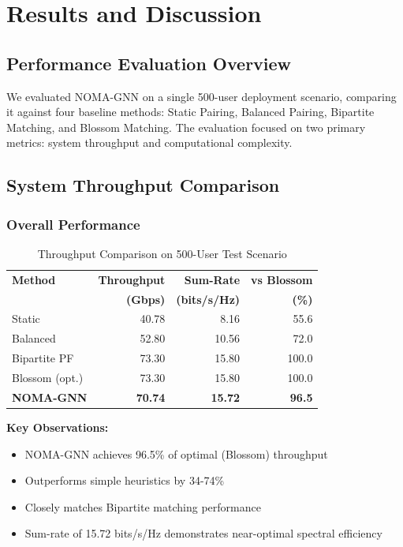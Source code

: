 \chapter{Results and Discussion}
\label{chap:results}

\section{Performance Evaluation Overview}

We evaluated NOMA-GNN on a single 500-user deployment scenario, comparing it against four baseline methods: Static Pairing, Balanced Pairing, Bipartite Matching, and Blossom Matching. The evaluation focused on two primary metrics: system throughput and computational complexity.

\section{System Throughput Comparison}

\subsection{Overall Performance}

\begin{table}[H]
\centering
\begin{tabular}{lrrr}
\toprule
\textbf{Method} & \textbf{Throughput} & \textbf{Sum-Rate} & \textbf{vs Blossom} \\
 & \textbf{(Gbps)} & \textbf{(bits/s/Hz)} & \textbf{(\%)} \\
\midrule
Static & 40.78 & 8.16 & 55.6 \\
Balanced & 52.80 & 10.56 & 72.0 \\
Bipartite PF & 73.30 & 15.80 & 100.0 \\
Blossom (opt.) & 73.30 & 15.80 & 100.0 \\
\textbf{NOMA-GNN} & \textbf{70.74} & \textbf{15.72} & \textbf{96.5} \\
\bottomrule
\end{tabular}
\caption{Throughput Comparison on 500-User Test Scenario}
\label{tab:throughput_comparison}
\end{table}

\textbf{Key Observations:}
\begin{itemize}
    \item NOMA-GNN achieves 96.5\% of optimal (Blossom) throughput
    \item Outperforms simple heuristics by 34-74\%
    \item Closely matches Bipartite matching performance
    \item Sum-rate of 15.72 bits/s/Hz demonstrates near-optimal spectral efficiency
\end{itemize}

